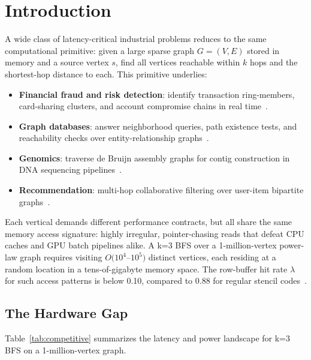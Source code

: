 \section{Introduction}

A wide class of latency-critical industrial problems reduces to the same computational
primitive: given a large sparse graph $G = (V, E)$ stored in memory and a source
vertex $s$, find all vertices reachable within $k$ hops and the shortest-hop distance
to each. This primitive underlies:

\begin{itemize}[leftmargin=*,itemsep=2pt]
\item \textbf{Financial fraud and risk detection}: identify transaction ring-members,
  card-sharing clusters, and account compromise chains in real time~\cite{akoglu2015graph}.
\item \textbf{Graph databases}: answer neighborhood queries, path existence tests,
  and reachability checks over entity-relationship graphs~\cite{besta2019demystifying}.
\item \textbf{Genomics}: traverse de Bruijn assembly graphs for contig construction
  in DNA sequencing pipelines~\cite{pevzner2001eulerian}.
\item \textbf{Recommendation}: multi-hop collaborative filtering over user-item bipartite
  graphs~\cite{ying2018graph}.
\end{itemize}

Each vertical demands different performance contracts, but all share the same memory
access signature: highly irregular, pointer-chasing reads that defeat CPU caches and
GPU batch pipelines alike. A k=3 BFS over a 1-million-vertex power-law graph requires
visiting $O(10^4$--$10^5)$ distinct vertices, each residing at a random location in a
tens-of-gigabyte memory space. The row-buffer hit rate $\lambda$ for such access
patterns is below 0.10, compared to 0.88 for regular stencil codes~\cite{fritz2026rmwwall}.

\subsection{The Hardware Gap}

Table~\ref{tab:competitive} summarizes the latency and power landscape for k=3 BFS
on a 1-million-vertex graph.


